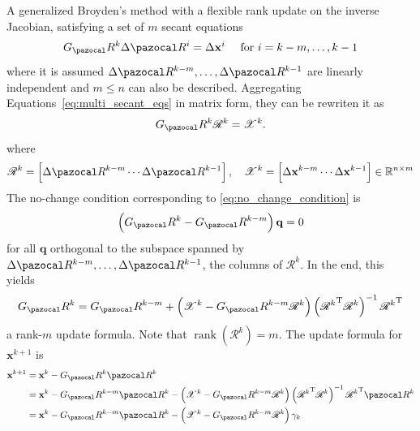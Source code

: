 A generalized Broyden's method with a flexible rank update on the inverse Jacobian, satisfying a set of \(m\) secant equations
\begin{equation} \label{eq:multi_secant_eqs}
  G_\pazocal R^{k} \Delta \pazocal R^{i}=\Delta \mathbf x^{i} \quad \text { for } i=k-m, \ldots, k-1
\end{equation}
where it is assumed \(\Delta \pazocal R^{k-m}, \ldots, \Delta \pazocal R^{k-1}\) are linearly independent and \(m \leqslant n\) can also be described.
Aggregating Equations~\eqref{eq:multi_secant_eqs} in matrix form, they can be rewriten it as
\begin{equation} \label{eq:multi_secant_eqs_mat}
  G_\pazocal R^{k} \mathscr{R}^{k}=\mathscr{X}^{k}.
\end{equation}
where
\begin{equation}
\mathscr{R}^{k}=\left[\Delta \pazocal R^{k-m} \cdots \Delta \pazocal R^{k-1}\right], \quad \mathscr{X}^{k}=\left[\Delta \mathbf x^{k-m} \cdots \Delta \mathbf x^{k-1}\right] \in \mathbb{R}^{n \times m}
\end{equation}
The no-change condition corresponding to \eqref{eq:no_change_condition} is
\begin{equation}
  \left(G_\pazocal R^{k}-G_\pazocal R^{k-m}\right) \mathbf q=0
\end{equation}
for all \(\mathbf q\) orthogonal to the subspace spanned by \(\Delta \pazocal R^{k-m}, \ldots, \Delta \pazocal R^{k-1}\), the columns of \(\mathscr{R}^{k}\).
In the end, this yields
\begin{equation}
  G_\pazocal R^{k}=G_\pazocal R^{k-m}+\left(\mathscr{X}^{k}-G_\pazocal R^{k-m} \mathscr{R}^{k}\right)\left({\mathscr{R}^{k}}^{\mathrm{T}} \mathscr{R}^{k}\right)^{-1} {\mathscr{R}^{k}}^{\mathrm{T}}
\end{equation}
a rank-\(m\) update formula.
Note that \(\operatorname{rank}\left(\mathscr{R}^{k}\right)=m\).
The update formula for \(\mathbf x^{k+1}\) is
\begin{align}
\mathbf x^{k+1} &=\mathbf x^{k}-G_\pazocal R^{k} \pazocal R^{k} \\
&=\mathbf x^{k}-G_\pazocal R^{k-m} \pazocal R^{k}-\left(\mathscr{X}^{k}-G_\pazocal R^{k-m} \mathscr{R}^{k}\right)\left({\mathscr{R}^{k}}^{\mathrm{T}} \mathscr{R}^{k}\right)^{-1} {\mathscr{R}^{k}}^{\mathrm{T}} \pazocal R^{k} \\
&=\mathbf x^{k}-G_\pazocal R^{k-m} \pazocal R^{k}-\left(\mathscr{X}^{k}-G_\pazocal R^{k-m} \mathscr{R}^{k}\right) \gamma_{k} \label{eq:update_gen_broyden_ls}
\end{align}
